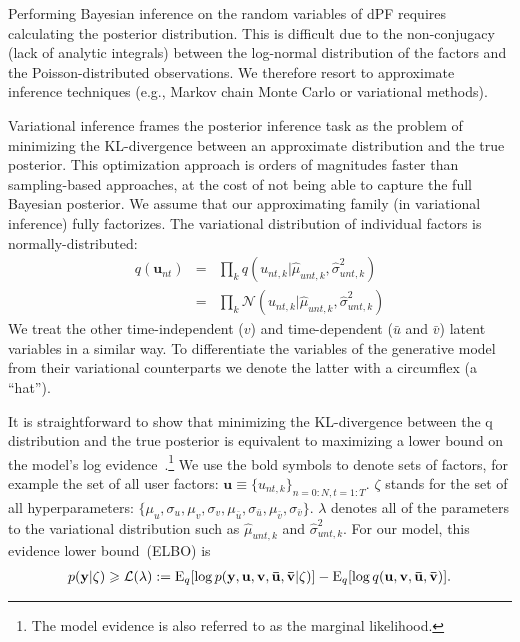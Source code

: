 \documentclass{sig-alternate}
\begin{document}
\noindent
Performing Bayesian inference on the random variables of dPF requires calculating the posterior distribution. This is difficult due to the non-conjugacy (lack of analytic integrals) between the log-normal
distribution of the factors and the Poisson-distributed observations.
We therefore resort to approximate inference techniques (e.g., Markov chain Monte Carlo or variational methods).

Variational inference frames the posterior inference task as the
problem of minimizing the KL-divergence
between an approximate distribution and the true posterior. This
optimization approach is orders of magnitudes faster than sampling-based
approaches, at the cost of not being able to capture the full Bayesian
posterior. 
We assume that our approximating family (in variational inference) fully
factorizes. The variational distribution of individual factors is
normally-distributed:
\begin{eqnarray}
  q(\mathbf{u}_{nt}) &=& \prod_k q(u_{nt,k}|\hat{\mu}_{unt,k},\hat{\sigma}_{unt,k}^2) \nonumber \\
  &=& \prod_k
  \mathcal{N}(u_{nt,k}|\hat{\mu}_{unt,k},\hat{\sigma}_{unt,k}^2) \nonumber
\end{eqnarray} 
We treat the other time-independent ($v$) and time-dependent ($\bar{u}$ and
$\bar{v}$) latent variables in a similar way. To differentiate the variables of the generative model from
their variational counterparts we denote the latter with a circumflex (a
``hat''). 


It is straightforward to show that minimizing the KL-divergence between
the q distribution and the true posterior is equivalent to maximizing a lower bound on the
model's log evidence~\citep{Jordan:1999:LGM:308574}.\footnote{The model evidence is also referred to as the
marginal likelihood.} We use the bold symbols to denote sets of factors, for example the
set of all user factors: $\mathbf{u} \equiv
\{ u_{nt,k} \}_{n=0:N,t=1:T}$. $\zeta$ stands for the set of all
hyperparameters: $\{\mu_u,\sigma_u,\mu_v,\sigma_v,\mu_{\bar{u}},\sigma_{\bar{u}},\mu_{\bar{v}},\sigma_{\bar{v}}\}$. $\lambda$
denotes all of the parameters to the variational distribution such as $\hat{\mu}_{unt,k}$ and $\hat{\sigma}_{unt,k}^2$.
For our model, this evidence lower bound~(ELBO) is
\begin{align}
 p(\mathbf{y} | \zeta ) \geqslant   {\cal L}(\lambda) := \text{E}_q[
  \log
  p(\mathbf{y}, \mathbf{u},\mathbf{v},\mathbf{\bar{u}},\mathbf{\bar{v}} | \zeta )   ] 
        - \text{E}_q [ \log q(\mathbf{u},\mathbf{v},\mathbf{\bar{u}},\mathbf{\bar{v}}) ].
\label{eq:elbo}
\end{align}
\end{document}
